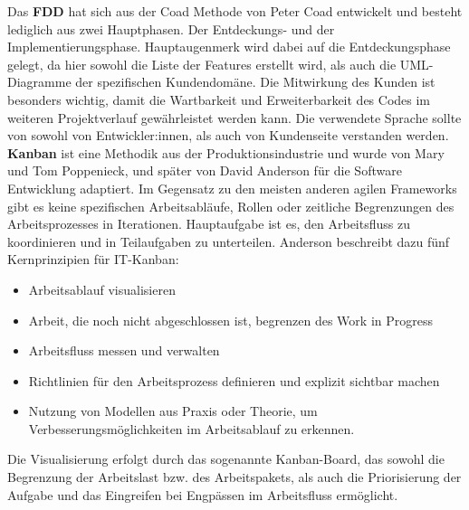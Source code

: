 Das \textbf{FDD} hat sich aus der Coad Methode von Peter Coad entwickelt und besteht lediglich aus zwei Hauptphasen. 
Der Entdeckungs- und der Implementierungsphase. Hauptaugenmerk wird dabei auf die Entdeckungsphase gelegt, da hier sowohl die 
Liste der Features erstellt wird, als auch die UML-Diagramme der spezifischen Kundendomäne. 
Die Mitwirkung des Kunden ist besonders wichtig, damit die Wartbarkeit und Erweiterbarkeit des Codes im weiteren Projektverlauf gewährleistet werden kann. 
Die verwendete Sprache sollte von sowohl von Entwickler:innen, als auch von Kundenseite verstanden werden. \cite{Chowdhury2011-hg} \\

\textbf{Kanban} ist eine Methodik aus der Produktionsindustrie und wurde von Mary und Tom Poppenieck, und später von David Anderson für 
die Software Entwicklung adaptiert. Im Gegensatz zu den meisten anderen agilen Frameworks gibt es keine spezifischen Arbeitsabläufe, 
Rollen oder zeitliche Begrenzungen des Arbeitsprozesses in Iterationen. 
Hauptaufgabe ist es, den Arbeitsfluss zu koordinieren und in Teilaufgaben zu unterteilen. Anderson beschreibt dazu fünf Kernprinzipien für IT-Kanban:
\begin{itemize}
    \item Arbeitsablauf visualisieren
    \item Arbeit, die noch nicht abgeschlossen ist, begrenzen des Work in Progress
    \item Arbeitsfluss messen und verwalten
    \item Richtlinien für den Arbeitsprozess definieren und explizit sichtbar machen
    \item Nutzung von Modellen aus Praxis oder Theorie, um Verbesserungsmöglichkeiten im Arbeitsablauf zu erkennen.
\end{itemize}
Die Visualisierung erfolgt durch das sogenannte Kanban-Board, das sowohl die Begrenzung der Arbeitslast bzw. des Arbeitspakets, 
als auch die Priorisierung der Aufgabe und das Eingreifen bei Engpässen im Arbeitsfluss ermöglicht.\cite{Ahmad2018-jv,Granulo2019-wm} \\

